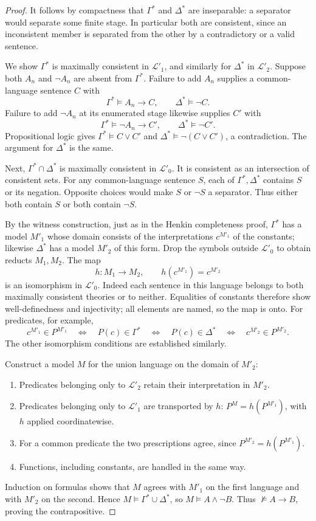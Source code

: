 \documentclass[UTF8,11pt]{ctexart}
\theoremstyle{definition}
\begin{document}
\begin{proof}
It follows by compactness that $\Gamma^*$ and $\Delta^*$ are inseparable:
a separator would separate some finite stage. In particular both are
consistent, since an inconsistent member is separated from the other
by a contradictory or a valid sentence.

We show $\Gamma^*$ is maximally consistent in $\mathcal L'_1$, and
similarly for $\Delta^*$ in $\mathcal L'_2$.
Suppose both $A_n$ and $\neg A_n$ are absent from $\Gamma^*$.
Failure to add $A_n$ supplies a common-language sentence $C$ with
\[
\Gamma^*\models A_n\to C,\qquad \Delta^*\models\neg C.
\]
Failure to add $\neg A_n$ at its enumerated stage likewise supplies $C'$ with
\[
\Gamma^*\models\neg A_n\to C',\qquad \Delta^*\models\neg C'.
\]
Propositional logic gives $\Gamma^*\models C\lor C'$ and
$\Delta^*\models\neg(C\lor C')$, a contradiction.
The argument for $\Delta^*$ is the same.

Next, $\Gamma^*\cap\Delta^*$ is maximally consistent in $\mathcal L'_0$.
It is consistent as an intersection of consistent sets.
For any common-language sentence $S$, each of $\Gamma^*,\Delta^*$ contains
$S$ or its negation. Opposite choices would make $S$ or $\neg S$ a
separator. Thus either both contain $S$ or both contain $\neg S$.

By the witness construction, just as in the Henkin completeness proof,
$\Gamma^*$ has a model $M'_1$ whose domain consists of the interpretations
$c^{M'_1}$ of the constants; likewise $\Delta^*$ has a model $M'_2$ of
this form. Drop the symbols outside $\mathcal L'_0$ to obtain reducts
$M_1,M_2$. The map
\[
h:M_1\longrightarrow M_2,\qquad h(c^{M'_1})=c^{M'_2}
\]
is an isomorphism in $\mathcal L'_0$. Indeed each sentence in this
language belongs to both maximally consistent theories or to neither.
Equalities of constants therefore show well-definedness and injectivity;
all elements are named, so the map is onto. For predicates, for example,
\[
c^{M'_1}\in P^{M'_1}\quad\Longleftrightarrow\quad
P(c)\in\Gamma^*\quad\Longleftrightarrow\quad
P(c)\in\Delta^*\quad\Longleftrightarrow\quad c^{M'_2}\in P^{M'_2}.
\]
The other isomorphism conditions are established similarly.

Construct a model $M$ for the union language on the domain of $M'_2$:
\begin{enumerate}
\item Predicates belonging only to $\mathcal L'_2$ retain their
interpretation in $M'_2$.
\item Predicates belonging only to $\mathcal L'_1$ are transported by
$h$: $P^M=h(P^{M'_1})$, with $h$ applied coordinatewise.
\item For a common predicate the two prescriptions agree, since
$P^{M'_2}=h(P^{M'_1})$.
\item Functions, including constants, are handled in the same way.
\end{enumerate}
Induction on formulas shows that $M$ agrees with $M'_1$ on the first
language and with $M'_2$ on the second. Hence
$M\models\Gamma^*\cup\Delta^*$, so $M\models A\land\neg B$.
Thus $\not\models A\to B$, proving the contrapositive.
\end{proof}
\end{document}
